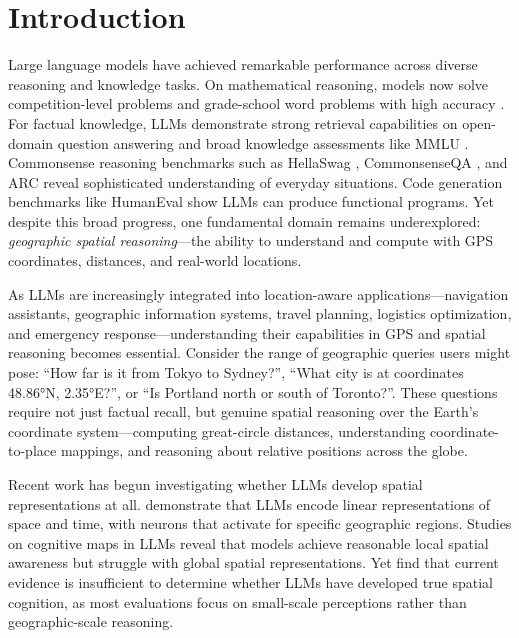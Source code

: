 \section{Introduction}
\label{sec:intro}

Large language models have achieved remarkable performance across diverse reasoning and knowledge tasks. On mathematical reasoning, models now solve competition-level problems \citep{hendrycks2021measuring} and grade-school word problems with high accuracy \citep{cobbe2021gsm8k}. For factual knowledge, LLMs demonstrate strong retrieval capabilities on open-domain question answering \citep{kwiatkowski2019natural, joshi2017triviaqa} and broad knowledge assessments like MMLU \citep{hendrycks2021mmlu}. Commonsense reasoning benchmarks such as HellaSwag \citep{zellers2019hellaswag}, CommonsenseQA \citep{talmor2019commonsenseqa}, and ARC \citep{clark2018arc} reveal sophisticated understanding of everyday situations. Code generation benchmarks like HumanEval \citep{chen2021humaneval} show LLMs can produce functional programs. Yet despite this broad progress, one fundamental domain remains underexplored: \textit{geographic spatial reasoning}---the ability to understand and compute with GPS coordinates, distances, and real-world locations.

As LLMs are increasingly integrated into location-aware applications---navigation assistants, geographic information systems, travel planning, logistics optimization, and emergency response---understanding their capabilities in GPS and spatial reasoning becomes essential. Consider the range of geographic queries users might pose: ``How far is it from Tokyo to Sydney?'', ``What city is at coordinates 48.86°N, 2.35°E?'', or ``Is Portland north or south of Toronto?''. These questions require not just factual recall, but genuine spatial reasoning over the Earth's coordinate system---computing great-circle distances, understanding coordinate-to-place mappings, and reasoning about relative positions across the globe.

Recent work has begun investigating whether LLMs develop spatial representations at all. \citet{gurnee2024language} demonstrate that LLMs encode linear representations of space and time, with neurons that activate for specific geographic regions. Studies on cognitive maps in LLMs \citep{yang2024thinking} reveal that models achieve reasonable local spatial awareness but struggle with global spatial representations. Yet \citet{liu2024evaluating} find that current evidence is insufficient to determine whether LLMs have developed true spatial cognition, as most evaluations focus on small-scale perceptions rather than geographic-scale reasoning.

